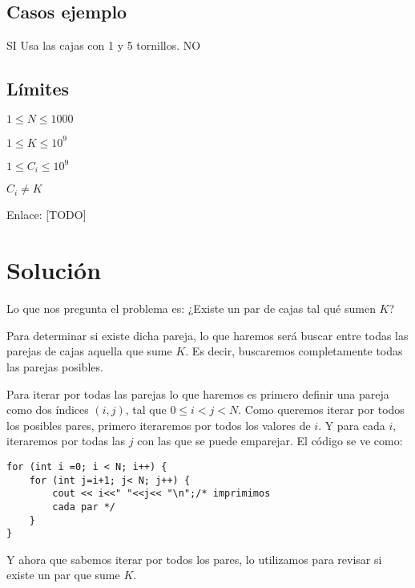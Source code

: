 \subsection*{Casos ejemplo}

\begin{casebox3}
	{SI}
	{Usa las cajas con 1 y 5 tornillos.}
	{NO}
	{}
\end{casebox3}

\subsection*{Límites}
\begin{plimits}
	\item \(1\leq N \leq 1000\)
	\item \(1\leq K \leq 10^9\)
	\item \(1\leq C_i \leq 10^9\)
	\item \(C_i \neq K\)
\end{plimits}

Enlace: [TODO]

\section * {Solución}

Lo que nos pregunta el problema es: ¿Existe un par de cajas tal qué sumen \(K\)?

Para determinar si existe dicha pareja, lo que haremos será buscar entre todas las parejas de cajas aquella que sume \(K\). Es decir, buscaremos completamente todas las parejas posibles.

Para iterar por todas las parejas lo que haremos es primero definir una pareja como dos índices \((i,j)\), tal que \(0\leq i < j <N\).  Como queremos iterar por todos los posibles pares, primero iteraremos por todos los valores de \(i\). Y para cada \(i\), iteraremos por todas las \(j\) con las que se puede emparejar. El código se ve como:

\begin{lstlisting}
for (int i =0; i < N; i++) {
	for (int j=i+1; j< N; j++) {
		cout << i<<" "<<j<< "\n";/* imprimimos 
		cada par */ 
	}
}
\end{lstlisting}

Y ahora que sabemos iterar por todos los pares, lo utilizamos para revisar si existe un par que sume \(K\). 


